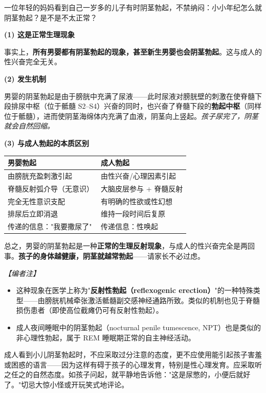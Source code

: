 \documentclass[12pt,a4paper,twoside]{ctexbook}
\begin{document}
一位年轻的妈妈看到自己一岁多的儿子有时阴茎勃起，不禁纳闷：小小年纪怎么就阴茎勃起？是不是不太正常？

\vspace{0.5em}
\noindent\textbf{(1) 这是正常生理现象}

事实上，\textbf{所有男婴都有阴茎勃起的现象，甚至新生男婴也会阴茎勃起}。这与成人的性兴奋完全无关。

\vspace{0.3em}
\noindent\textbf{(2) 发生机制}

男婴的阴茎勃起是由于膀胱中充满了尿液——此时尿液对膀胱壁的刺激在使脊髓下段排尿中枢（位于骶髓 S2--S4）兴奋的同时，也兴奋了脊髓下段的\textbf{勃起中枢}（同样位于骶髓），进而使阴茎海绵体内充满了血液，阴茎向上竖起。\textit{孩子尿完了，阴茎就会自然回缩。}

\vspace{0.3em}
\noindent\textbf{(3) 与成人勃起的本质区别}

{\small\setlength{\tabcolsep}{4pt}\setlength{\emergencystretch}{2em}%
\begin{tabular}{|p{3.6cm}|p{3.6cm}|}
\hline
\textbf{男婴勃起} & \textbf{成人勃起} \\
\hline
由膀胱充盈刺激引起 & 由性兴奋/心理因素引起 \\
\hline
脊髓反射弧介导（无意识） & 大脑皮层参与 + 脊髓反射 \\
\hline
完全无性意识支配 & 有明确的性欲或性幻想 \\
\hline
排尿后立即消退 & 维持一段时间后复原 \\
\hline
传递的信息："我要撒尿了" & 传递信息：性唤起 \\
\hline
\end{tabular}%
}

总之，男婴的阴茎勃起是一种\textbf{正常的生理反射现象}，与成人的性兴奋完全是两回事。\textbf{孩子的身体越健康，阴茎就越常勃起}——请家长不必过虑。

\vspace{0.3em}
\noindent\textit{【编者注】}
\begin{itemize}
	\item 这种现象在医学上称为"\textbf{反射性勃起（reflexogenic erection）}"的一种特殊类型——由膀胱机械牵张激活骶髓副交感神经通路所致。类似的机制也见于脊髓损伤患者（即使高位截瘫仍可有反射性勃起）。
	\item 成人夜间睡眠中的阴茎勃起（nocturnal penile tumescence, NPT）也是类似的非心理性勃起，属于 REM 睡眠期正常的自主神经活动。
\end{itemize}

\begin{tcolorbox}[colback=pink!5!white,colframe=red!50!black,title=贴心小叮咛]
成人看到小儿阴茎勃起时，不应采取过分注意的态度，更不应使用能引起孩子害羞或困惑的语言——因为这样有碍于孩子的心理发育，特别是性心理发育。应采取听之任之的自然态度。如孩子问起，就平静地告诉他："这是尿憋的，小便后就好了。"切忌大惊小怪或开玩笑式地评论。
\end{tcolorbox}
\end{document}
